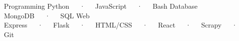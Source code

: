 

\begin{cvtechnicals}
  \cvtechnical %
    {Programming} %
    {Python~~~·~~~JavaScript~~~·~~~Bash} %
    {Database} %
    {MongoDB~~~·~~~SQL} %
    {Web} %
    {Express~~~·~~~Flask~~~·~~~HTML/CSS~~~·~~~React~~~·~~~Scrapy~~~·~~~Git} %
\end{cvtechnicals}